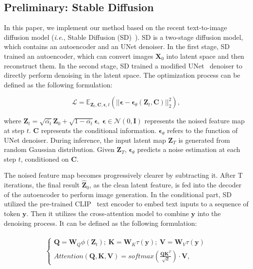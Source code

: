 \subsection{Preliminary: Stable Diffusion} In this paper, we implement our method based on the recent text-to-image diffusion model (\textit{i.e.}, Stable Diffusion (SD)~\cite{ldm}). SD is a two-stage diffusion model, which contains an autoencoder and an UNet denoiser. In the first stage, SD trained an autoencoder, which can convert images $\mathbf{X}_0$  into latent space and then reconstruct them. In the second stage, SD trained a modified UNet~\cite{unet} denoiser to directly perform denoising in the latent space. The optimization process can be defined as the following formulation:

\begin{equation}
    \mathcal{L} = \mathbb{E}_{\mathbf{Z}_{t},\mathbf{C},\mathbf{\epsilon},t}(||\mathbf{\epsilon} - \mathbf{\epsilon}_{\theta}(\mathbf{Z}_t,\mathbf{C})||_2^2),
\end{equation}

where $\mathbf{Z}_{t}=\sqrt{\overline{\alpha_{t}}}\mathbf{Z}_0+\sqrt{1-\overline{\alpha_{t}}}\mathbf{\epsilon},\ \mathbf{\epsilon} \in \mathcal{N}(0,\mathbf{I})$ represents the noised feature map at step $t$. $\mathbf{C}$ represents the conditional information. $\mathbf{\epsilon}_{\theta}$ refers to the function of UNet denoiser. During inference, the input latent map $\mathbf{Z}_T$ is generated from random Gaussian distribution.  Given $\mathbf{Z}_T$, $\mathbf{\epsilon}_{\theta}$ predicts a noise estimation at each step $t$, conditioned on $\mathbf{C}$. 

The noised feature map becomes progressively clearer by subtracting it. After T iterations, the final result $\hat{\mathbf{Z}}_0$, as the clean latent feature, is fed into the decoder of the autoencoder to perform image generation. In the conditional part, SD utilized the pre-trained CLIP~\cite{clip} text encoder to embed text inputs to a sequence of token $\mathbf{y}$. Then it utilizes the cross-attention model to combine $\mathbf{y}$ into the denoising process. It can be defined as the following formulation:

\begin{align}
\begin{split}
\left \{
\begin{array}{ll}
    \mathbf{Q} = \mathbf{W}_Q \phi(\mathbf{Z}_t);\ \mathbf{K} = \mathbf{W}_K \tau(\mathbf{y});\ \mathbf{V} = \mathbf{W}_V \tau(\mathbf{y})\\
    Attention(\mathbf{Q}, \mathbf{K}, \mathbf{V}) = softmax(\frac{\mathbf{Q}\mathbf{K}^T}{\sqrt{d}})\cdot \mathbf{V},
\end{array}
\right.
\end{split}
\end{align}


